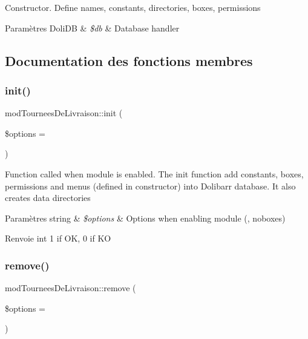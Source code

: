 Constructor. Define names, constants, directories, boxes, permissions


\begin{DoxyParams}[1]{Paramètres}
Doli\+DB & {\em \$db} & Database handler \\
\hline
\end{DoxyParams}


\subsection{Documentation des fonctions membres}
\mbox{\label{classmodTourneesDeLivraison_ac491842ccad1b2aed3f63116b2cfd297}} 
\subsubsection{\texorpdfstring{init()}{init()}}
{\footnotesize\ttfamily mod\+Tournees\+De\+Livraison\+::init (\begin{DoxyParamCaption}\item[{}]{\$options = {\ttfamily \textquotesingle{}\textquotesingle{}} }\end{DoxyParamCaption})}

Function called when module is enabled. The init function add constants, boxes, permissions and menus (defined in constructor) into Dolibarr database. It also creates data directories


\begin{DoxyParams}[1]{Paramètres}
string & {\em \$options} & Options when enabling module (\textquotesingle{}\textquotesingle{}, \textquotesingle{}noboxes\textquotesingle{}) \\
\hline
\end{DoxyParams}
\begin{DoxyReturn}{Renvoie}
int 1 if OK, 0 if KO 
\end{DoxyReturn}
\mbox{\label{classmodTourneesDeLivraison_aad184c60cb2e396ffd18c07aefaa24d8}} 
\subsubsection{\texorpdfstring{remove()}{remove()}}
{\footnotesize\ttfamily mod\+Tournees\+De\+Livraison\+::remove (\begin{DoxyParamCaption}\item[{}]{\$options = {\ttfamily \textquotesingle{}\textquotesingle{}} }\end{DoxyParamCaption})}

